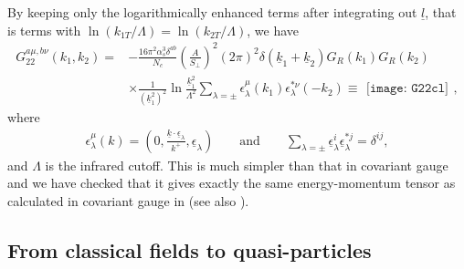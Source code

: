 \documentclass[onecolumn,showpacs,nobibnotes,nofootinbib,12pt,aps,prd,showpacs,notitlepage,nofootinbib,preprintnumbers,amsmath,amssymb]{article}
\begin{document}
By keeping only the logarithmically enhanced terms after integrating
out $\underline{l}$, that is terms with $\ln (k_{1T}/\Lambda) = \ln
(k_{2T}/\Lambda)$, we have
\begin{align}\label{Gcl}
  G_{22}^{a\mu,b\nu}(k_1,
  k_2)=&-\frac{16\pi^2\alpha_s^3\delta^{ab}}{N_c}\left(\frac{A}{S_\perp}\right)^2
  (2\pi)^2\delta(\underline{k}_1+\underline{k}_2) G_R(k_1) G_R(k_2)\nonumber\\
  &\times
  \frac{1}{(\underline{k}_{1}^2)^2}\ln\frac{\underline{k}_1^2}{\Lambda^2}\sum\limits_{\lambda=\pm}\epsilon_\lambda^\mu(k_1)
  \epsilon_{\lambda}^{*\nu}(-k_2)\equiv
\begin{array}{l}
\texttt{[image: G22cl]}
\end{array},
\end{align}
where
\begin{align}
  \epsilon^\mu_\lambda(k)=(0,\frac{\underline{k}\cdot\underline{\epsilon}_\lambda}{k^+},\underline{\epsilon}_\lambda)\qquad\text{and}\qquad
  \sum\limits_{\lambda=\pm}\underline{\epsilon}_\lambda^i
  \underline{\epsilon}^{*j}_\lambda=\delta^{ij},
\end{align}
and $\Lambda$ is the infrared cutoff. This is much simpler than that
in covariant gauge and we have checked that it gives exactly the same
energy-momentum tensor as calculated in covariant gauge in
\cite{Kovchegov:2005ss} (see also
\cite{Lappi:2006hq,Fukushima:2007ja}).


\subsection{From classical fields to quasi-particles}
\end{document}
